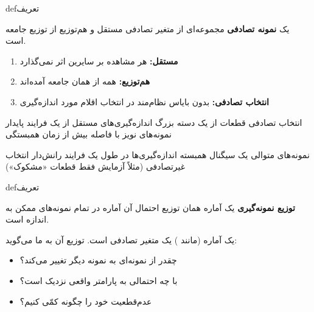 
\begin{PSbox}[unbreakable]{def}{تعریف}

یک \textbf{نمونه تصادفی}  مجموعه‌ای از  متغیر تصادفی مستقل و هم‌توزیع  از توزیع جامعه است.

\end{PSbox}


\begin{enumerate}
\def\labelenumi{\arabic{enumi}.}
\tightlist
\item
  \textbf{مستقل:} هر مشاهده بر سایرین اثر نمی‌گذارد
\item
  \textbf{هم‌توزیع:} همه از همان جامعه آمده‌اند
\item
  \textbf{انتخاب تصادفی:} بدون بایاس نظام‌مند در انتخاب اقلام مورد اندازه‌گیری
\end{enumerate}


\lr{\mbox{\PSyes{}}} انتخاب تصادفی قطعات از یک دسته بزرگ\PSbr{}\lr{\mbox{\PSyes{}}} اندازه‌گیری‌های مستقل از یک فرایند پایدار\PSbr{}\lr{\mbox{\PSyes{}}} نمونه‌های نویز با فاصله بیش از زمان همبستگی


\lr{\mbox{\PSno{}}} نمونه‌های متوالی یک سیگنال همبسته\PSbr{}\lr{\mbox{\PSno{}}} اندازه‌گیری‌ها در طول یک فرایند رانش‌دار\PSbr{}\lr{\mbox{\PSno{}}} انتخاب غیرتصادفی (مثلاً آزمایش فقط قطعات «مشکوک»)


\begin{PSbox}[unbreakable]{def}{تعریف}

\textbf{توزیع نمونه‌گیری} یک آماره همان توزیع احتمال آن آماره در تمام نمونه‌های ممکن به اندازه  است.

\end{PSbox}


یک آماره (مانند ) یک متغیر تصادفی است. توزیع آن به ما می‌گوید:

\begin{itemize}
\tightlist
\item
  چقدر از نمونه‌ای به نمونه دیگر تغییر می‌کند؟
\item
  با چه احتمالی به پارامتر واقعی نزدیک است؟
\item
  عدم‌قطعیت خود را چگونه کمّی کنیم؟
\end{itemize}

